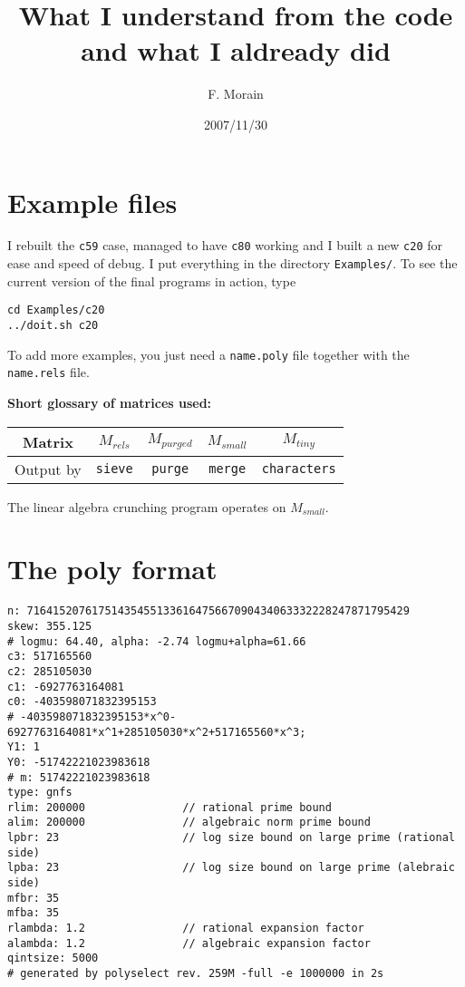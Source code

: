 \documentclass{article}
\begin{document}
\title{What I understand from the code and what I aldready did}
\author{F. Morain}
\date{2007/11/30}

\maketitle

\section{Example files}

I rebuilt the \verb+c59+ case, managed to have \verb+c80+ working and
I built a new \verb+c20+ for ease and speed of debug. I put everything
in the directory \verb+Examples/+. To see the current version of the
final programs in action, type
\begin{verbatim}
cd Examples/c20
../doit.sh c20
\end{verbatim}
To add more examples, you just need a \verb+name.poly+ file together
with the \verb+name.rels+ file.

\bigskip
{\bf Short glossary of matrices used:}

\begin{center}
\begin{tabular}{|c||c|c|c|c|}\hline
Matrix & $M_{rels}$ & $M_{purged}$ & $M_{small}$ & $M_{tiny}$ \\ \hline
Output by & {\tt sieve} & {\tt purge} & {\tt merge} & {\tt characters}
\\ \hline
\end{tabular}
\end{center}

The linear algebra crunching program operates on $M_{small}$.

\section{The poly format}

\begin{verbatim}
n: 71641520761751435455133616475667090434063332228247871795429
skew: 355.125
# logmu: 64.40, alpha: -2.74 logmu+alpha=61.66
c3: 517165560
c2: 285105030
c1: -6927763164081
c0: -403598071832395153
# -403598071832395153*x^0-6927763164081*x^1+285105030*x^2+517165560*x^3;
Y1: 1
Y0: -51742221023983618
# m: 51742221023983618
type: gnfs
rlim: 200000               // rational prime bound
alim: 200000               // algebraic norm prime bound
lpbr: 23                   // log size bound on large prime (rational side)
lpba: 23                   // log size bound on large prime (alebraic side)
mfbr: 35
mfba: 35
rlambda: 1.2               // rational expansion factor
alambda: 1.2               // algebraic expansion factor
qintsize: 5000
# generated by polyselect rev. 259M -full -e 1000000 in 2s
\end{verbatim}
\end{document}
